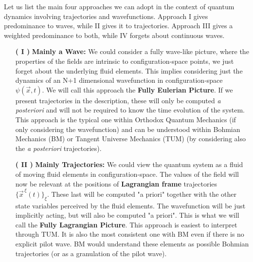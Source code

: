 \documentclass[11pt, a4paper]{article} %
\begin{document}
Let us list the main four approaches we can adopt in the context of quantum dynamics involving trajectories and wavefunctions. Approach I gives predominance to waves, while II gives it to trajectories. Approach III gives a weighted predominance to both, while IV forgets about continuous waves.
\vspace{-0.2cm}
\begin{enumerate}
\item[\bf ( I )] {\bf Mainly a Wave: } We could consider a fully wave-like picture, where the properties of the fields are intrinsic to configuration-space points, we just forget about the underlying fluid elements. This implies considering just the dynamics of an N+1 dimensional wavefunction in configuration-space $\psi(\vec{x},t)$. We will call this approach the {\bf Fully Eulerian Picture}. If we present trajectories in the description, these will only be computed {\em a posteriori} and will not be required to know the time evolution of the system. This approach is the typical one within Orthodox Quantum Mechanics (if only considering the wavefunction) and can be understood within Bohmian Mechanics (BM) or Tangent Universe Mechanics (TUM) (by considering also the {\em a posteriori} trajectories).


\item[\bf ( II )]{\bf Mainly Trajectories:} We could view the quantum system as a fluid of moving fluid elements in configuration-space. The values of the field will now be relevant at the positions of {\bf Lagrangian frame} trajectories $\{\vec{x}^{\, \xi}(t)\}_\xi$. These last will be computed "a priori" together with the other state variables perceived by the fluid elements. The wavefunction will be just implicitly acting, but will also be computed "a priori". This is what we will call the {\bf Fully Lagrangian Picture}. This approach is easiest to interpret through TUM. It is also the most consistent one with BM even if there is no explicit pilot wave. BM would understand these elements as possible Bohmian trajectories (or as a granulation of the pilot wave).


\end{enumerate}
\end{document}
